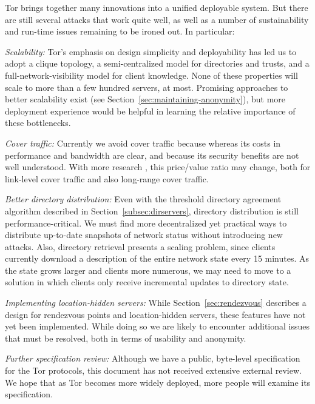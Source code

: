 \documentclass[times,10pt,twocolumn]{article}
\begin{document}
\label{sec:conclusion}

Tor brings together many innovations into
a unified deployable system. But there are still several attacks that
work quite well, as well as a number of sustainability and run-time
issues remaining to be ironed out. In particular:

%

\emph{Scalability:} Tor's emphasis on design simplicity and
deployability has led us to adopt a clique topology, a
semi-centralized model for directories and trusts, and a
full-network-visibility model for client knowledge.  None of these
properties will scale to more than a few hundred servers, at most.
Promising approaches to better scalability exist (see
Section~\ref{sec:maintaining-anonymity}), but more deployment
experience would be helpful in learning the relative importance of
these bottlenecks.

\emph{Cover traffic:} Currently we avoid cover traffic because
whereas its costs in performance and bandwidth are clear, and because its
security benefits are not well understood. With more research
\cite{SS03,defensive-dropping}, this price/value ratio may change,
both for link-level cover traffic and also long-range cover traffic.

\emph{Better directory distribution:} Even with the threshold
directory agreement algorithm described in Section~\ref{subsec:dirservers},
directory distribution is still performance-critical. We must find more
decentralized yet practical ways to distribute up-to-date snapshots of
network status without introducing new attacks.  Also, directory
retrieval presents a scaling problem, since clients currently
download a description of the entire network state every 15
minutes.  As the state grows larger and clients more numerous, we
may need to move to a solution in which clients only receive
incremental updates to directory state.

\emph{Implementing location-hidden servers:} While
Section~\ref{sec:rendezvous} describes a design for rendezvous
points and location-hidden servers, these features have not yet been
implemented.  While doing so we are likely to encounter additional
issues that must be resolved, both in terms of usability and anonymity.

\emph{Further specification review:} Although we have a public,
byte-level specification for the Tor protocols, this document has
not received extensive external review.  We hope that as Tor
becomes more widely deployed, more people will examine its
specification.
\end{document}
